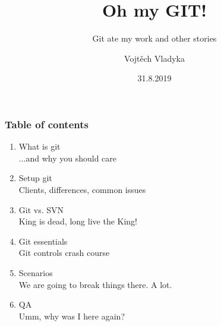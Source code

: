 \documentclass{beamer}
\title{Oh my GIT!}
\subtitle{Git ate my work and other stories}
\author{Vojtěch Vladyka}
\date{31.8.2019}
\begin{document}
    \frame{\titlepage}
    \begin{frame}
       \frametitle{Table of contents}
       \begin{enumerate}
           \item What is git
           \\   \textcolor{solarizedRebase01}{\footnotesize\hspace{1em} ...and why you should care}	
           \item Setup git
           \\   \textcolor{solarizedRebase01}{\footnotesize\hspace{1em} Clients, differences, common issues}	
           \item Git vs. SVN
           \\   \textcolor{solarizedRebase01}{\footnotesize\hspace{1em} King is dead, long live the King!}	
           \item Git essentials
           \\   \textcolor{solarizedRebase01}{\footnotesize\hspace{1em} Git controls crash course}	
           \item Scenarios
           \\   \textcolor{solarizedRebase01}{\footnotesize\hspace{1em} We are going to break things there. A lot.}	
           \item QA
           \\   \textcolor{solarizedRebase01}{\footnotesize\hspace{1em} Umm, why was I here again?}
       \end{enumerate}
    \end{frame}
\end{document}
